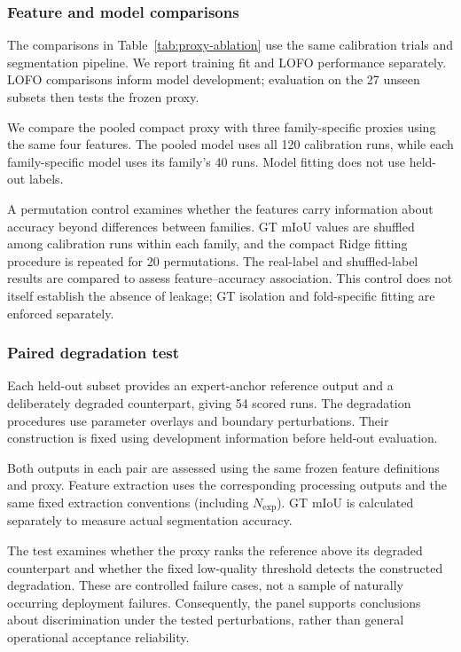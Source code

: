 \documentclass[a4paper,fleqn]{cas-dc}
\begin{document}
{\subsubsection{Feature and model comparisons}
\label{sec:comparators}

The comparisons in Table~\ref{tab:proxy-ablation} use the same calibration trials and segmentation pipeline. We report training fit and LOFO performance separately. LOFO comparisons inform model development; evaluation on the 27 unseen subsets then tests the frozen proxy.

We compare the pooled compact proxy with three family-specific proxies using the same four features. The pooled model uses all 120 calibration runs, while each family-specific model uses its family's 40 runs. Model fitting does not use held-out labels.

A permutation control examines whether the features carry information about accuracy beyond differences between families. GT mIoU values are shuffled among calibration runs within each family, and the compact Ridge fitting procedure is repeated for 20 permutations. The real-label and shuffled-label results are compared to assess feature--accuracy association. This control does not itself establish the absence of leakage; GT isolation and fold-specific fitting are enforced separately.


\subsubsection{Paired degradation test}
\label{sec:stress-test}

Each held-out subset provides an expert-anchor reference output and a deliberately degraded counterpart, giving 54 scored runs. The degradation procedures use parameter overlays and boundary perturbations. Their construction is fixed using development information before held-out evaluation.

Both outputs in each pair are assessed using the same frozen feature definitions and proxy. Feature extraction uses the corresponding processing outputs and the same fixed extraction conventions (including $N_{\mathrm{exp}}$). GT mIoU is calculated separately to measure actual segmentation accuracy.

The test examines whether the proxy ranks the reference above its degraded counterpart and whether the fixed low-quality threshold detects the constructed degradation. These are controlled failure cases, not a sample of naturally occurring deployment failures. Consequently, the panel supports conclusions about discrimination under the tested perturbations, rather than general operational acceptance reliability.


}
\end{document}
